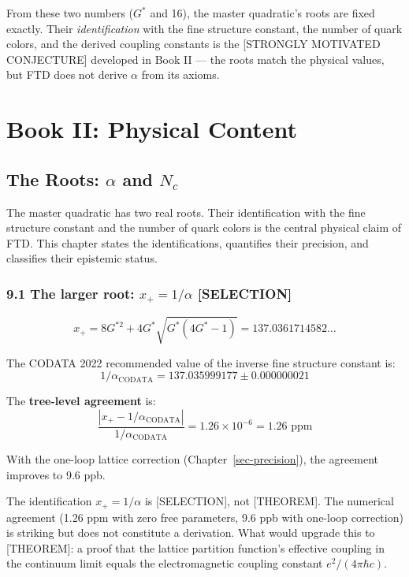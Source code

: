 \documentclass[
  11pt,
  letterpaper,
  twoside,
  openright]{book}
\begin{document}
From these two numbers (\(G^*\) and 16), the master quadratic's roots
are fixed exactly. Their \emph{identification} with the fine structure
constant, the number of quark colors, and the derived coupling constants
is the {[}STRONGLY MOTIVATED CONJECTURE{]} developed in Book II --- the
roots match the physical values, but FTD does not derive \(\alpha\) from
its axioms.

\part{Book II: Physical Content}

\chapter{\texorpdfstring{The Roots: \(\alpha\) and
\(N_c\)}{The Roots: \textbackslash alpha and N\_c}}\label{sec-roots}

The master quadratic has two real roots. Their identification with the
fine structure constant and the number of quark colors is the central
physical claim of FTD. This chapter states the identifications,
quantifies their precision, and classifies their epistemic status.

\section{\texorpdfstring{9.1 The larger root: \(x_+ = 1/\alpha\)
{[}SELECTION{]}}{9.1 The larger root: x\_+ = 1/\textbackslash alpha {[}SELECTION{]}}}\label{the-larger-root-x_-1alpha-selection}

\[
x_+ = 8G^{*2} + 4G^*\sqrt{G^*(4G^* - 1)} = 137.0361714582\ldots
\]

The CODATA 2022 recommended value of the inverse fine structure constant
is: \[
1/\alpha_{\text{CODATA}} = 137.035999177 \pm 0.000000021
\]

The \textbf{tree-level agreement} is: \[
\frac{|x_+ - 1/\alpha_{\text{CODATA}}|}{1/\alpha_{\text{CODATA}}} = 1.26 \times 10^{-6} = 1.26 \text{ ppm}
\]

With the one-loop lattice correction (Chapter~\ref{sec-precision}), the
agreement improves to 9.6 ppb.

\begin{ftdselection}

The identification \(x_+ = 1/\alpha\) is {[}SELECTION{]}, not
{[}THEOREM{]}. The numerical agreement (1.26 ppm with zero free
parameters, 9.6 ppb with one-loop correction) is striking but does not
constitute a derivation. What would upgrade this to {[}THEOREM{]}: a
proof that the lattice partition function's effective coupling in the
continuum limit equals the electromagnetic coupling constant
\(e^2/(4\pi\hbar c)\).

\end{ftdselection}
\end{document}

